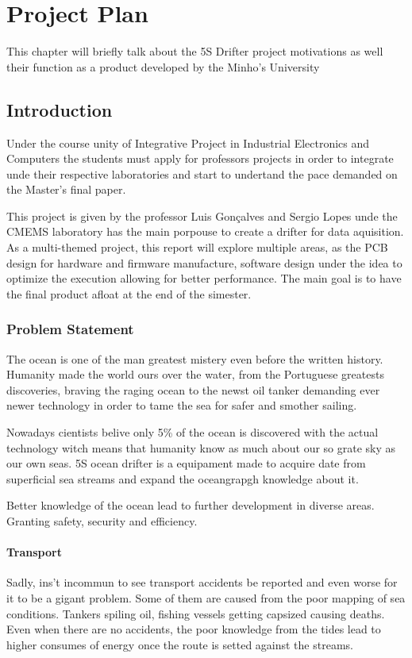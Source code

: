 \chapter{Project Plan}
    This chapter will briefly talk about the 5S Drifter project motivations as well their function as a product developed 
    by the Minho's University  
\section{Introduction}
Under the course unity of Integrative Project in Industrial Electronics and Computers the students must
apply for professors projects in order to integrate unde their respective laboratories and start to undertand the pace
demanded on the Master's final paper.

This project is given by the professor Luis Gonçalves and Sergio Lopes unde the CMEMS laboratory
has the main porpouse to create a drifter for data aquisition. As a multi-themed project, this report will
explore multiple areas, as the PCB design for hardware and firmware manufacture, software design under the idea to optimize
the execution allowing for better performance. The main goal is to have the final product afloat at the end of the simester.
\subsection{Problem Statement}
The ocean is one of the man greatest mistery even before the written history. Humanity made the world ours over the water, 
from the Portuguese greatests discoveries, braving the raging ocean to the newst oil tanker demanding ever newer technology
in order to tame the sea for safer and smother sailing.

Nowadays cientists belive only 5\% of the ocean is discovered with the actual technology witch means that humanity 
know as much about our so grate sky as our own seas. 5S ocean drifter is a equipament made to acquire date from 
superficial sea streams and expand the oceangrapgh knowledge about it.

Better knowledge of the ocean lead to further development in diverse areas. Granting safety,
security and efficiency.

\subsubsection{Transport}
Sadly, ins't incommun to see transport accidents be reported and even worse for it to be a gigant
problem. Some of them are caused from the poor mapping of sea conditions. Tankers spiling oil, fishing vessels
getting capsized causing deaths. Even when there are no accidents, the poor knowledge from the tides lead to higher
consumes of energy once the route is setted against the streams.

